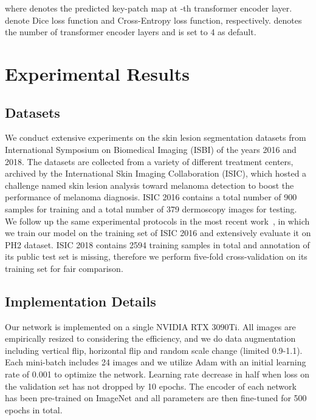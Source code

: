 \documentclass[runningheads]{paper478-llncs}
\begin{document}
where  denotes the predicted key-patch map at -th transformer encoder layer.  denote Dice loss function and Cross-Entropy loss function, respectively.  denotes the number of transformer encoder layers and is set to 4 as default. 

\section{Experimental Results}
\subsection{Datasets}
We conduct extensive experiments on the skin lesion segmentation datasets from International Symposium on Biomedical Imaging (ISBI) of the years 2016 and 2018. The datasets are collected from a variety of different treatment centers, archived by the International Skin Imaging Collaboration (ISIC), which hosted a challenge named skin lesion analysis toward melanoma detection to boost the performance of melanoma diagnosis. 
ISIC 2016 contains a total number of 900 samples for training and a total number of 379 dermoscopy images for testing. We follow up the same experimental protocols in the most recent work~\cite{9157193}, in which we train our model on the training set of ISIC 2016 and extensively evaluate it on PH2 dataset.
ISIC 2018 contains 2594 training samples in total and annotation of its public test set is missing, therefore we perform five-fold cross-validation on its training set for fair comparison.

\subsection{Implementation Details}
Our network is implemented on a single NVIDIA RTX 3090Ti. All images are empirically resized to  considering the efficiency, and we do data augmentation including vertical flip, horizontal flip and random scale change (limited 0.9-1.1). Each mini-batch includes 24 images and we utilize Adam with an initial learning rate of 0.001 to optimize the network. Learning rate decrease in half when loss on the validation set has not dropped by 10 epochs. The encoder of each network has been pre-trained on ImageNet and all parameters are then fine-tuned for 500 epochs in total.
\end{document}
